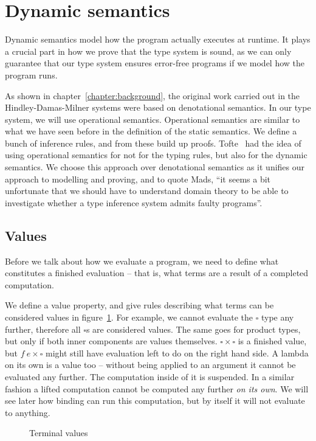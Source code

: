 \section{Dynamic semantics}
Dynamic semantics model how the program actually executes at
runtime. It plays a crucial part in how we prove that the type system
is sound, as we can only guarantee that our type system ensures
error-free programs if we model how the program runs.

As shown in chapter~\ref{chapter:background}, the original work
carried out in the Hindley-Damas-Milner systems were based on
denotational semantics. In our type system, we will use operational
semantics. Operational semantics are similar to what we have seen
before in the definition of the static semantics. We define a bunch of
inference rules, and from these build up proofs. Tofte~\cite{tofte1988}
had the idea of using operational semantics for not for the
typing rules, but also for the dynamic semantics. We choose this
approach over denotational semantics as it unifies our approach to
modelling and proving, and to quote Mads, ``it seems a bit
unfortunate that we should have to understand domain theory to be able
to investigate whether a type inference system admits faulty
programs''.


\subsection{Values}
Before we talk about how we evaluate a program, we need to
define what constitutes a finished evaluation -- that is, what
terms are a result of a completed computation.

We define a value property, and give rules describing what terms can
be considered values in figure~\ref{fig:values}. For example, we
cannot evaluate the $\square$ type any further, therefore all $\square$s
are considered values. The same goes for product types, but only if
both inner components are values themselves. $\square \times \square$ is a
finished value, but $f \ e \times \square$ might still have evaluation left to
do on the right hand side.
A lambda on its own is a value too --
without being applied to an argument it cannot be evaluated any
further. The computation inside of it is suspended.
In a similar fashion a lifted computation cannot be computed any
further \textit{on its own}. We will see later how binding can run
this computation, but by itself it will not evaluate to anything.

\begin{figure}
  \caption{Terminal values} \label{fig:values}
\end{figure}

